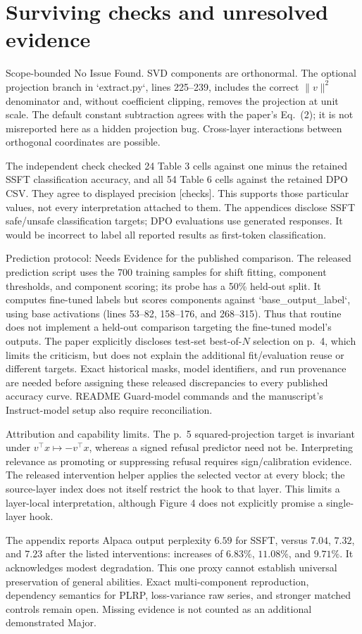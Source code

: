 \documentclass[10pt]{article}
\begin{document}
\section*{Surviving checks and unresolved evidence}
Scope-bounded No Issue Found. SVD components are orthonormal. The optional projection branch in `extract.py`, lines 225–239, includes the correct \(\|v\|^2\) denominator and, without coefficient clipping, removes the projection at unit scale. The default constant subtraction agrees with the paper’s Eq. (2); it is not misreported here as a hidden projection bug. Cross-layer interactions between orthogonal coordinates are possible.\par
The independent check checked 24 Table 3 cells against one minus the retained SSFT classification accuracy, and all 54 Table 6 cells against the retained DPO CSV. They agree to displayed precision [checks]. This supports those particular values, not every interpretation attached to them. The appendices disclose SSFT safe/unsafe classification targets; DPO evaluations use generated responses. It would be incorrect to label all reported results as first-token classification.\par
Prediction protocol: Needs Evidence for the published comparison. The released prediction script uses the 700 training samples for shift fitting, component thresholds, and component scoring; its probe has a 50\% held-out split. It computes fine-tuned labels but scores components against `base\_output\_label`, using base activations (lines 53–82, 158–176, and 268–315). Thus that routine does not implement a held-out comparison targeting the fine-tuned model’s outputs. The paper explicitly discloses test-set best-of-\(N\) selection on p. 4, which limits the criticism, but does not explain the additional fit/evaluation reuse or different targets. Exact historical masks, model identifiers, and run provenance are needed before assigning these released discrepancies to every published accuracy curve. README Guard-model commands and the manuscript’s Instruct-model setup also require reconciliation.\par
Attribution and capability limits. The p. 5 squared-projection target is invariant under \(v^\top x\mapsto-v^\top x\), whereas a signed refusal predictor need not be. Interpreting relevance as promoting or suppressing refusal requires sign/calibration evidence. The released intervention helper applies the selected vector at every block; the source-layer index does not itself restrict the hook to that layer. This limits a layer-local interpretation, although Figure 4 does not explicitly promise a single-layer hook.\par
The appendix reports Alpaca output perplexity \(6.59\) for SSFT, versus \(7.04\), \(7.32\), and \(7.23\) after the listed interventions: increases of \(6.83\%\), \(11.08\%\), and \(9.71\%\). It acknowledges modest degradation. This one proxy cannot establish universal preservation of general abilities. Exact multi-component reproduction, dependency semantics for PLRP, loss-variance raw series, and stronger matched controls remain open. Missing evidence is not counted as an additional demonstrated Major.\par
\end{document}
